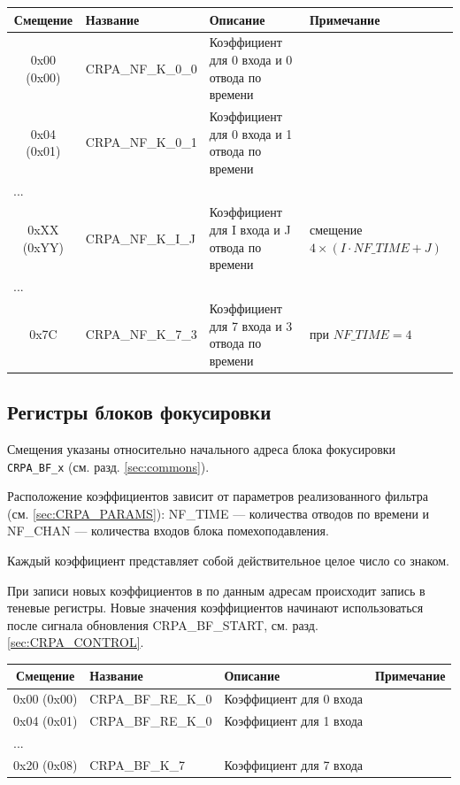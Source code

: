 \begin{longtable}{|c|p{3cm}|p{5cm}|p{3cm}|}
\hline
\textbf{Смещение} & \textbf{Название} & \textbf{Описание} & \textbf{Примечание} \\
\hline
0x00 (0x00) & CRPA\_NF\_K\_0\_0  & Коэффициент для 0 входа и 0 отвода по времени &  \\
\hline
0x04 (0x01) & CRPA\_NF\_K\_0\_1  & Коэффициент для 0 входа и 1 отвода по времени &  \\
\hline
\multicolumn{4}{|l|}{...} \\
\hline
0xXX (0xYY) & CRPA\_NF\_K\_I\_J  & Коэффициент для I входа и J отвода по времени & смещение
$4\times(I\cdot NF\_TIME + J)$ \\
\hline
\multicolumn{4}{|l|}{...} \\
\hline
0x7C  & CRPA\_NF\_K\_7\_3  & Коэффициент для 7 входа и 3 отвода по времени & при $NF\_TIME=4$ \\
\hline
\end{longtable}

\subsection{Регистры блоков фокусировки}
\label{sec:CRPA_BF}

Смещения указаны относительно начального адреса блока фокусировки
\texttt{CRPA\_BF\_x} (см. разд. \ref{sec:commons}).

Расположение коэффициентов зависит от параметров реализованного фильтра
(см. \ref{sec:CRPA_PARAMS}): NF\_TIME --- количества отводов по времени и NF\_CHAN ---
количества входов блока помехоподавления.

Каждый коэффициент представляет собой действительное целое число со знаком.

При записи новых коэффициентов в по данным адресам происходит запись в теневые
регистры. Новые значения коэффициентов начинают использоваться после сигнала обновления
CRPA\_BF\_START, см. разд. \ref{sec:CRPA_CONTROL}.

\begin{longtable}{|c|p{3cm}|p{5cm}|p{3cm}|}
\hline
\textbf{Смещение} & \textbf{Название} & \textbf{Описание} & \textbf{Примечание} \\
\hline
0x00 (0x00)  & CRPA\_BF\_RE\_K\_0  & Коэффициент для 0 входа &  \\
\hline
0x04 (0x01) & CRPA\_BF\_RE\_K\_0  & Коэффициент для 1 входа &  \\
\hline
\multicolumn{4}{|l|}{...} \\
\hline
0x20 (0x08) & CRPA\_BF\_K\_7  & Коэффициент для 7 входа &  \\
\hline
\end{longtable}

